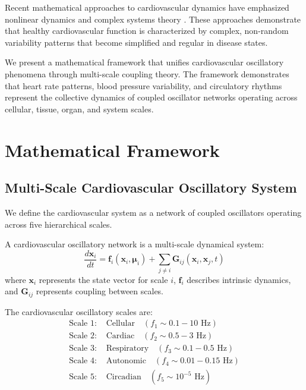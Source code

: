 \documentclass[twocolumn]{article}
\begin{document}
Recent mathematical approaches to cardiovascular dynamics have emphasized nonlinear dynamics and complex systems theory \citep{goldberger2002fractal,peng1995quantification}. These approaches demonstrate that healthy cardiovascular function is characterized by complex, non-random variability patterns that become simplified and regular in disease states.

We present a mathematical framework that unifies cardiovascular oscillatory phenomena through multi-scale coupling theory. The framework demonstrates that heart rate patterns, blood pressure variability, and circulatory rhythms represent the collective dynamics of coupled oscillator networks operating across cellular, tissue, organ, and system scales.

\section{Mathematical Framework}

\subsection{Multi-Scale Cardiovascular Oscillatory System}

We define the cardiovascular system as a network of coupled oscillators operating across five hierarchical scales.

\begin{definition}
A cardiovascular oscillatory network is a multi-scale dynamical system:
\begin{equation}
\frac{d\mathbf{x}_i}{dt} = \mathbf{f}_i(\mathbf{x}_i, \boldsymbol{\mu}_i) + \sum_{j \neq i} \mathbf{G}_{ij}(\mathbf{x}_i, \mathbf{x}_j, t)
\label{eq:cv_network}
\end{equation}
where $\mathbf{x}_i$ represents the state vector for scale $i$, $\mathbf{f}_i$ describes intrinsic dynamics, and $\mathbf{G}_{ij}$ represents coupling between scales.
\end{definition}

\begin{definition}
The cardiovascular oscillatory scales are:
\begin{align}
\text{Scale 1: } &\text{Cellular} \quad (f_1 \sim 0.1-10 \text{ Hz}) \label{eq:cv_cellular} \\
\text{Scale 2: } &\text{Cardiac} \quad (f_2 \sim 0.5-3 \text{ Hz}) \label{eq:cv_cardiac} \\
\text{Scale 3: } &\text{Respiratory} \quad (f_3 \sim 0.1-0.5 \text{ Hz}) \label{eq:cv_respiratory} \\
\text{Scale 4: } &\text{Autonomic} \quad (f_4 \sim 0.01-0.15 \text{ Hz}) \label{eq:cv_autonomic} \\
\text{Scale 5: } &\text{Circadian} \quad (f_5 \sim 10^{-5} \text{ Hz}) \label{eq:cv_circadian}
\end{align}
\end{definition}
\end{document}

